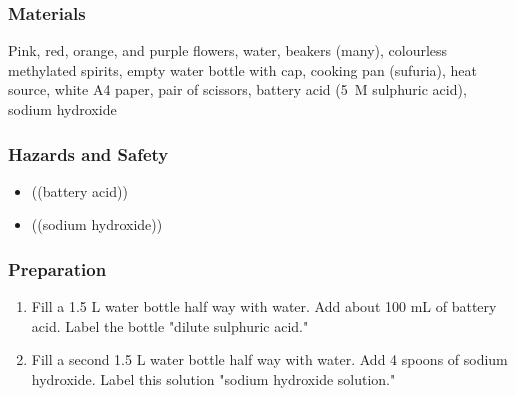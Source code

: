 \subsubsection*{Materials}
Pink, red, orange, and purple flowers, water, beakers (many), colourless methylated spirits, empty water bottle with cap, cooking pan (sufuria), heat source, white A4 paper, pair of scissors, battery acid (5~M sulphuric acid), sodium hydroxide

\subsubsection*{Hazards and Safety}
\begin{itemize}
\item{((battery acid))}
\item{((sodium hydroxide))}
\end{itemize}

\subsubsection*{Preparation}
\begin{enumerate}
\item{Fill a 1.5 L water bottle half way with water. Add about 100 mL of battery acid. Label the bottle "dilute sulphuric acid."}
\item{Fill a second 1.5 L water bottle half way with water. Add 4 spoons of sodium hydroxide. Label this solution "sodium hydroxide solution."}
\end{enumerate}

